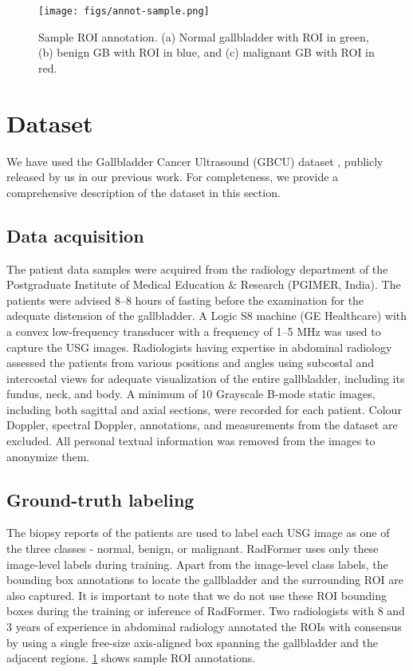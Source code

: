 \documentclass[twocolumn,final]{elsarticle}
\def\myarch{RadFormer\xspace}
\begin{document}
%
\begin{figure}
    \centering
    \texttt{[image: figs/annot-sample.png]}
    \caption{Sample ROI annotation. (a) Normal gallbladder with ROI in green, (b) benign GB with ROI in blue, and (c) malignant GB with ROI in red. }
    \label{fig:data_sample}
\end{figure}
%
\section{Dataset}
%
We have used the Gallbladder Cancer Ultrasound (GBCU) dataset \citep{basu2022surpassing}, publicly released by us in our previous work. For completeness, we provide a comprehensive description of the dataset in this section.

\subsection{Data acquisition}
%
The patient data samples were acquired from the radiology department of the Postgraduate Institute of Medical Education \& Research (PGIMER, India). The patients were advised 8--8 hours of fasting before the examination for the adequate distension of the gallbladder. A Logic S8 machine (GE Healthcare) with a convex low-frequency transducer with a frequency of 1--5 MHz was used to capture the USG images. Radiologists having expertise in abdominal radiology assessed the patients from various positions and angles using subcostal and intercostal views for adequate visualization of the entire gallbladder, including its fundus, neck, and body. 
A minimum of 10 Grayscale B-mode static images, including both sagittal and axial sections, were recorded for each patient.
Colour Doppler, spectral Doppler, annotations, and measurements from the dataset are excluded. All personal textual information was removed from the images to anonymize them. 

\subsection{Ground-truth labeling}
%
The biopsy reports of the patients are used to label each USG image as one of the three classes - normal, benign, or malignant. \myarch uses only these image-level labels during training. Apart from the image-level class labels, the bounding box annotations to locate the gallbladder and the surrounding ROI are also captured. It is important to note that we do not use these ROI bounding boxes during the training or inference of \myarch. 
Two radiologists with 8 and 3 years of experience in abdominal radiology annotated the ROIs with consensus by using a single free-size axis-aligned box spanning the gallbladder and the adjacent regions. \cref{fig:data_sample} shows sample ROI annotations.
\end{document}
